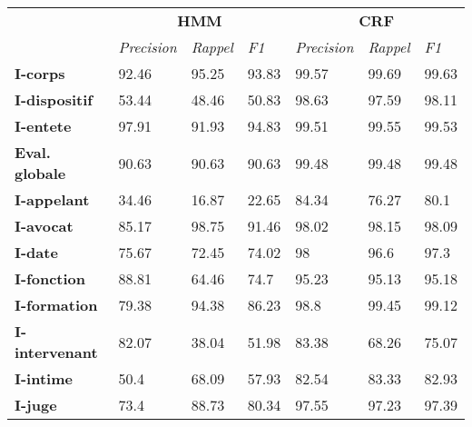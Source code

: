 \begin{table}[!h]
	\centering
	\scriptsize
	\begin{tabular}{|l|l|l|l|l|l|l|}
		\hline
	\multirow{2}{*}{}	& \multicolumn{3}{c}{\textbf{HMM}}  &      \multicolumn{3}{|c|}{\textbf{CRF}}          \\ \cline{2-7}
		& \textit{Precision} & \textit{Rappel} & \textit{F1} & \textit{Precision} & \textit{Rappel} & \textit{F1} \\ \hline
		\textbf{I-corps}       & 92.46              & 95.25           & 93.83       & 99.57              & 99.69           & 99.63       \\ 
		\textbf{I-dispositif}  & 53.44              & 48.46           & 50.83       & 98.63              & 97.59           & 98.11       \\ 
		\textbf{I-entete}      & 97.91              & 91.93           & 94.83       & 99.51              & 99.55           & 99.53       \\ \hline
		\textbf{Eval. globale}       & 90.63              & 90.63           & 90.63       & 99.48              & 99.48           & 99.48       \\ \hline
		\noalign{\smallskip}\hline\noalign{\smallskip}
		\textbf{I-appelant}    & 34.46              & 16.87           & 22.65       & 84.34              & 76.27           & 80.1        \\ 
		\textbf{I-avocat}      & 85.17              & 98.75           & 91.46       & 98.02              & 98.15           & 98.09       \\ 
		\textbf{I-date}        & 75.67              & 72.45           & 74.02       & 98                 & 96.6            & 97.3        \\ 
		\textbf{I-fonction}    & 88.81              & 64.46           & 74.7        & 95.23              & 95.13           & 95.18       \\ 
		\textbf{I-formation}   & 79.38              & 94.38           & 86.23       & 98.8               & 99.45           & 99.12       \\ 
		\textbf{I-intervenant} & 82.07              & 38.04           & 51.98       & 83.38              & 68.26           & 75.07       \\ 
		\textbf{I-intime}      & 50.4               & 68.09           & 57.93       & 82.54              & 83.33           & 82.93       \\ 
		\textbf{I-juge}        & 73.4               & 88.73           & 80.34       & 97.55              & 97.23           & 97.39       \\ 

\end{tabular}
\end{table}
